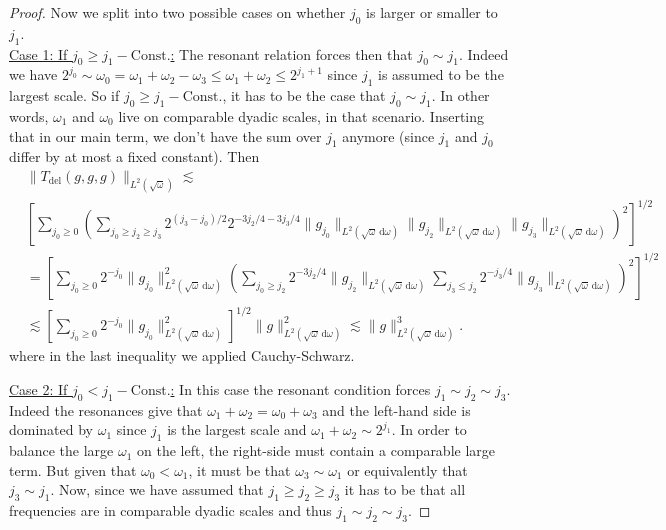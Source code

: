 \documentclass[10pt,a4paper]{amsart}
\newcommand{\dd}{{\, \mathrm d}}
\begin{document}
\begin{proof}
        Now we split into two possible cases on whether $j_0$ is larger or smaller to $j_1$. \\

        \noindent
        \underline{Case 1: If $j_0 \geq j_1 - \text{Const.}$:} The resonant relation forces then that 
        $j_0 \sim j_1$. Indeed we have 
         $2^{j_0}\sim \omega_0  = \omega_1+\omega_2 - \omega_3 \leq \omega_1+\omega_2 \leq 2^{j_1+1}$ since $j_1$ is assumed to be the largest scale. So if 
$j_0 \geq j_1 - \text{Const.}$, it has to be the case that $j_0 \sim j_1$. In other words, $\omega_1$ and $\omega_0$ live on comparable dyadic scales, in that scenario.
Inserting that in our main term, we don't have the sum over $j_1$ anymore (since $j_1$ and $j_0$ differ by at most a fixed constant). Then 
\begin{equation}
    \begin{split}
      &\|T_{\text{del}}(g,g,g)\|_{L^2(\sqrt{\omega})} 
        \lesssim \\ & 
        \left[\sum_{j_0\geq 0}
                       \left( \sum_{j_0\geq j_2 \geq j_3} 
                       2^{(j_3-j_0)/2}
                       2^{-3j_2/4 - 3j_3/4}
\|g_{j_0}\|_{L^2(\sqrt{\omega}\dd\omega)}
 \| g_{j_2}\|_{L^2(\sqrt{\omega}\dd\omega)}
\| g_{j_3}\|_{L^2(\sqrt{\omega}\dd\omega)}\right)^2 \right]^{1/2}\\
& = \left[\sum_{j_0\geq 0}
2^{-j_0}
\|g_{j_0}\|_{L^2(\sqrt{\omega}\dd\omega)}^2 
              \left( \sum_{j_0\geq j_2}       
 2^{-3j_2/4} \| g_{j_2} \|_{L^2(\sqrt{\omega}\dd\omega)}
 \sum_{j_3 \leq j_2 } 2^{-j_3/4} 
\| g_{j_3}\|_{L^2(\sqrt{\omega}\dd\omega)}\right)^2 \right]^{1/2}
\\
    & \lesssim \left[\sum_{j_0\geq 0} 2^{-j_0}\|g_{j_0}\|_{L^2(\sqrt{\omega}\dd\omega)}^2
                \right]^{1/2} \|g\|_{L^2(\sqrt{\omega}\dd\omega)}^2 \lesssim \|g\|_{L^2(\sqrt{\omega}\dd\omega)}^3.
           \end{split}
        \end{equation}
where in the last inequality we applied Cauchy-Schwarz. 

        \noindent
        \underline{Case 2: If $j_0 < j_1 - \text{Const.}$:} In this case the resonant condition forces $j_1\sim j_2 \sim j_3$. Indeed the resonances give that $\omega_1+ \omega_2=\omega_0+\omega_3$ and the left-hand side is dominated by $\omega_1$ since $j_1$ is the largest scale and $\omega_1+\omega_2 \sim 2^{j_1}$. In order to balance the large $\omega_1$ on the left, the right-side must contain a comparable large term. But  given that $\omega_0< \omega_1$, it must be that $\omega_3 \sim \omega_1$ or equivalently that $j_3 \sim j_1$. Now, since we have assumed that $j_1\geq j_2\geq j_3$ it has to be that all  frequencies are in comparable dyadic scales and thus $j_1\sim j_2 \sim j_3$. 


\end{proof}
\end{document}
